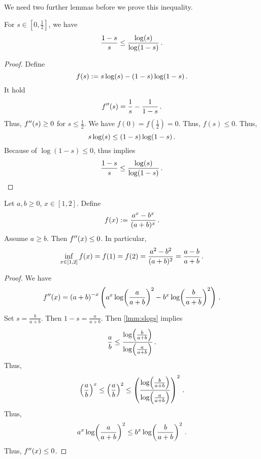 %
We need two further lemmas before we prove this inequality.
%
\begin{lemma}\label{lmm:slogs}
	For $s\in[0,\frac12]$, we have
	\begin{equation*}
		\frac{1-s}{s} \leq \frac{\log(s)}{\log(1-s)}
		\, .
	\end{equation*}
\end{lemma}
%
\begin{proof}
	Define
	\begin{equation*}
		f(s) := s\log(s) - (1-s)\log(1-s)
		\, .
	\end{equation*}
	It hold
	\begin{equation*}
		f^{\prime\prime}(s) = \frac1s-\frac1{1-s} 
		\, .
	\end{equation*}
	Thus, $f^{\prime\prime}(s) \geq 0$ for $s\leq\frac12$.
	We have $f(0)=f(\frac12)=0$.
	Thus, $f(s) \leq 0$. Thus,
	\begin{equation*}
		s\log(s) \leq (1-s)\log(1-s)
		\, .
	\end{equation*}
	Because of $\log(1-s) \leq 0$, thus implies 
	\begin{equation*}
		\frac{1-s}{s} \leq \frac{\log(s)}{\log(1-s)}
		\, .
	\end{equation*}
\end{proof}
%
\begin{lemma}\label{lmm:abxfrac}
	Let $a,b\geq0$, $x\in[1,2]$.
	Define
	\begin{equation*}
		f(x) := \frac{a^{x}-b^{x}}{(a+b)^{x}}
		\, .
	\end{equation*}
	Assume $a\geq b$.
	Then $f^{\prime\prime}(x) \leq 0$.
	In particular,
	\begin{equation*}
		\inf_{x\in[1,2]} f(x) = f(1) = f(2) = \frac{a^2-b^2}{(a+b)^2} = \frac{a-b}{a+b}
		\, .
	\end{equation*}
\end{lemma}
%
\begin{proof}
	We have
	\begin{equation*}
		f^{\prime\prime}(x) = \left( a+b \right)^{-x} \left( a^x \log\!\left( \frac{a}{a+b} \right)^2 - b^x \log\!\left( \frac{b}{a+b} \right)^2 \right)
		\, .
	\end{equation*}
	Set $s = \frac{b}{a+b}$. Then $1-s = \frac{a}{a+b}$. Then \autoref{lmm:slogs} implies
	\begin{equation*}
		\frac{a}{b} \leq \frac{\log\!\left( \frac{b}{a+b} \right)}{\log\!\left( \frac{a}{a+b} \right)}
		\, .
	\end{equation*}
	Thus,
	\begin{align*}
		\left( \frac{a}{b} \right)^x \leq \left( \frac{a}{b} \right)^2 \leq \left( \frac{\log\!\left( \frac{b}{a+b} \right)}{\log\!\left( \frac{a}{a+b} \right)} \right)^2
		\, .
	\end{align*}
	Thus,
	\begin{equation*}
		a^x \log\!\left( \frac{a}{a+b} \right)^2 \leq b^x \log\!\left( \frac{b}{a+b} \right)^2
		\, .
	\end{equation*}
	Thus, $f^{\prime\prime}(x) \leq 0$.
\end{proof}
